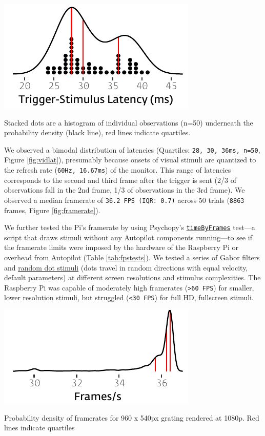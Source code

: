 \begin{marginfigure}[1.8cm]
\includegraphics[]{figures/test_6_visual_lags.pdf}
\caption{Stacked dots are a histogram of individual observations (n=50) underneath the probability density (black line), red lines indicate quartiles.}
\label{fig:vidlat}
\end{marginfigure}

We observed a bimodal distribution of latencies (Quartiles: \texttt{28, 30, 36ms, n=50}, Figure \ref{fig:vidlat}), presumably because onsets of visual stimuli are quantized to the refresh rate (\texttt{60Hz, 16.67ms}) of the monitor. This range of latencies corresponds to the second and third frame after the trigger is sent (2/3 of observations fall in the 2nd frame, 1/3 of observations in the 3rd frame). We observed a median framerate of \texttt{36.2 FPS (IQR: 0.7)} across 50 trials (\texttt{8863} frames, Figure \ref{fig:framerate}). 

We further tested the Pi's framerate by using Psychopy's \href{https://github.com/psychopy/psychopy/blob/3.1/psychopy/demos/coder/timing/timeByFrames.py}{\texttt{timeByFrames}} test---a script that draws stimuli without any Autopilot components running---to see if the framerate limits were imposed by the hardware of the Raspberry Pi or overhead from Autopilot (Table \ref{tab:fpstests}). We tested a series of Gabor filters and \href{https://www.psychopy.org/api/visual/dotstim.html#psychopy.visual.DotStim}{random dot stimuli} (dots travel in random directions with equal velocity, default parameters) at different screen resolutions and stimulus complexities. The Raspberry Pi was capable of moderately high framerates (\texttt{>60 FPS}) for smaller, lower resolution stimuli, but struggled (\texttt{<30 FPS}) for full HD, fullscreen stimuli.

\begin{marginfigure}[-0.7cm]
\includegraphics[]{figures/test_7_fps.pdf}
\caption{Probability density of framerates for 960 x 540px grating rendered at 1080p. Red lines indicate quartiles}
\label{fig:framerate}
\end{marginfigure}

